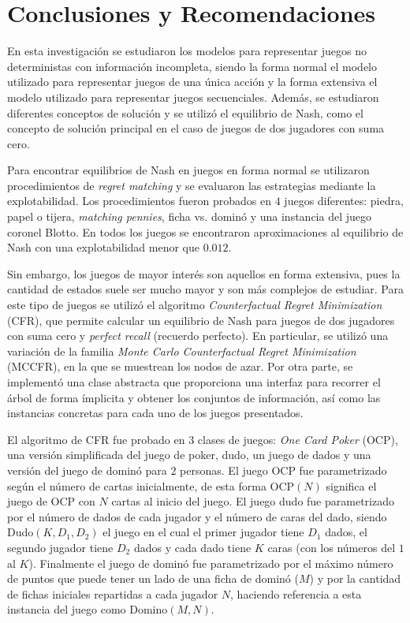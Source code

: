 \chapter*{Conclusiones y Recomendaciones}

En esta investigación se estudiaron los modelos para representar juegos no deterministas con información incompleta, siendo la forma normal el modelo utilizado para representar juegos de una única acción y la forma extensiva el modelo utilizado para representar juegos secuenciales. Además, se estudiaron diferentes conceptos de solución y se utilizó el equilibrio de Nash, como el concepto de solución principal en el caso de juegos de dos jugadores con suma cero.

Para encontrar equilibrios de Nash en juegos en forma normal se utilizaron procedimientos de \textit{regret matching} y se evaluaron las estrategias mediante la explotabilidad. Los procedimientos fueron probados en $4$ juegos diferentes: piedra, papel o tijera, \textit{matching pennies}, ficha vs. dominó y una instancia del juego coronel Blotto. En todos los juegos se encontraron aproximaciones al equilibrio de Nash con una explotabilidad menor que $0.012$.

Sin embargo, los juegos de mayor interés son aquellos en forma extensiva, pues la cantidad de estados suele ser mucho mayor y son más complejos de estudiar. Para este tipo de juegos se utilizó el algoritmo \textit{Counterfactual Regret Minimization} (CFR), que permite calcular un equilibrio de Nash para juegos de dos jugadores con suma cero y \textit{perfect recall} (recuerdo perfecto). En particular, se utilizó una variación de la familia \textit{Monte Carlo Counterfactual Regret Minimization} (MCCFR), en la que se muestrean los nodos de azar. Por otra parte, se implementó una clase abstracta que proporciona una interfaz para recorrer el árbol de forma ímplicita y obtener los conjuntos de información, así como las instancias concretas para cada uno de los juegos presentados.

El algoritmo de CFR fue probado en $3$ clases de juegos: \textit{One Card Poker} (OCP), una versión simplificada del juego de poker, dudo, un juego de dados y una versión del juego de dominó para $2$ personas. El juego OCP fue parametrizado según el número de cartas inicialmente, de esta forma OCP$(N)$ significa el juego de OCP con $N$ cartas al inicio del juego. El juego dudo fue parametrizado por el número de dados de cada jugador y el número de caras del dado, siendo Dudo$(K, D_1, D_2)$ el juego en el cual el primer jugador tiene $D_1$ dados, el segundo jugador tiene $D_2$ dados y cada dado tiene $K$ caras (con los números del $1$ al $K$). Finalmente el juego de dominó fue parametrizado por el máximo número de puntos que puede tener un lado de una ficha de dominó ($M$) y por la cantidad de fichas iniciales repartidas a cada jugador $N$, haciendo referencia a esta instancia del juego como Domino$(M, N)$.

